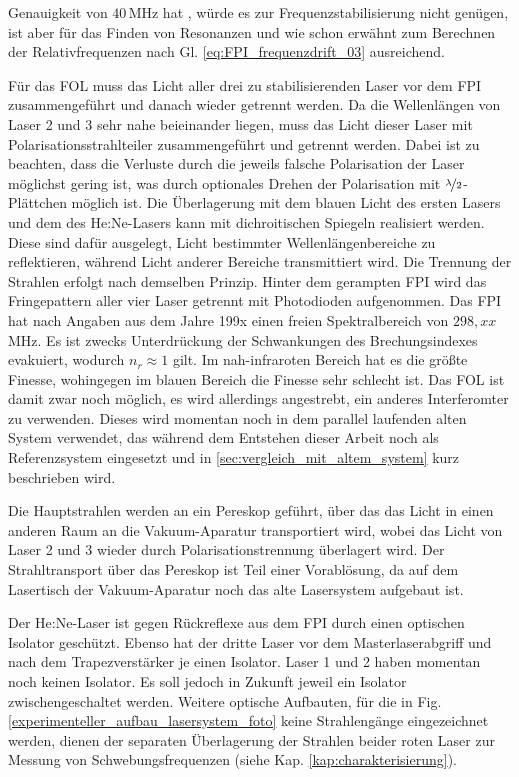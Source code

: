 Genauigkeit von $40\,$MHz hat
\cite{wavemeter_hardware_guide}, würde es zur Frequenzstabilisierung nicht genügen, ist aber für das Finden von Resonanzen und wie schon erwähnt zum Berechnen der Relativfrequenzen nach Gl. \eqref{eq:FPI_frequenzdrift_03}
ausreichend.\par
Für das FOL muss das Licht aller drei zu stabilisierenden
Laser vor dem FPI zusammengeführt und danach wieder getrennt werden. Da die
Wellenlängen von Laser 2 und 3 sehr nahe beieinander liegen, muss das Licht
dieser Laser mit Polarisationsstrahlteiler zusammengeführt und getrennt werden.
Dabei ist zu beachten, dass die Verluste durch die jeweils falsche Polarisation
der Laser möglichst gering ist, was durch optionales Drehen der
Polarisation mit $\nicefrac{\lambda}{2}$-Plättchen möglich ist. Die Überlagerung
mit dem blauen Licht des ersten Lasers und dem des He:Ne-Lasers kann mit
dichroitischen Spiegeln realisiert werden. Diese sind dafür ausgelegt, Licht
bestimmter Wellenlängenbereiche zu reflektieren, während Licht anderer  Bereiche
transmittiert wird. Die Trennung der Strahlen erfolgt nach demselben Prinzip.
Hinter dem gerampten FPI wird das Fringepattern aller vier Laser getrennt mit Photodioden aufgenommen. Das FPI hat nach Angaben aus dem Jahre 199x einen
freien Spektralbereich von $298,xx\,$MHz. Es ist zwecks Unterdrückung der
Schwankungen des Brechungsindexes evakuiert, wodurch $n_r\approx1$ gilt. Im
nah-infraroten Bereich hat es die größte Finesse, wohingegen im blauen Bereich
die Finesse sehr schlecht ist. Das FOL ist damit zwar noch
möglich, es wird allerdings angestrebt, ein anderes Interferomter zu verwenden.
Dieses wird momentan noch in dem parallel laufenden alten System verwendet, das
während dem Entstehen dieser Arbeit noch als Referenzsystem eingesetzt und in
\ref{sec:vergleich_mit_altem_system} kurz beschrieben wird.\par
Die Hauptstrahlen werden an ein Pereskop geführt, über das das Licht in einen
anderen Raum an die Vakuum-Aparatur transportiert wird, wobei das Licht von
Laser 2 und 3 wieder durch Polarisationstrennung überlagert wird. Der
Strahltransport über das Pereskop ist Teil einer Vorablösung, da auf dem
Lasertisch der Vakuum-Aparatur noch das alte Lasersystem aufgebaut ist.\par
Der He:Ne-Laser ist gegen Rückreflexe aus dem FPI durch einen optischen Isolator
geschützt. Ebenso hat der dritte Laser vor dem Masterlaserabgriff und nach dem
Trapezverstärker je einen Isolator. Laser 1 und 2 haben momentan noch keinen
Isolator. Es soll jedoch in Zukunft jeweil ein Isolator zwischengeschaltet
werden. Weitere optische Aufbauten, für die in Fig.
\ref{experimenteller_aufbau_lasersystem_foto} keine Strahlengänge eingezeichnet
werden, dienen der separaten Überlagerung der Strahlen beider roten Laser zur
Messung von Schwebungsfrequenzen (siehe Kap. \ref{kap:charakterisierung}).


